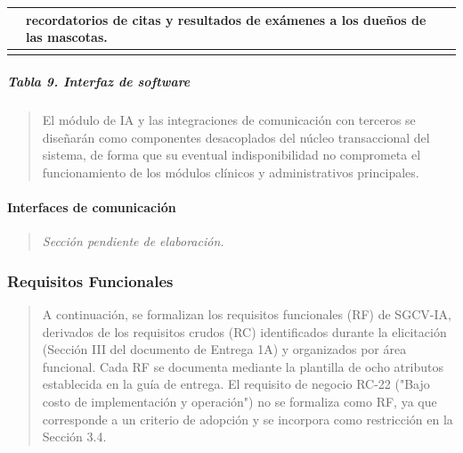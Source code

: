 {\def\LTcaptype{none} %
\begin{longtable}[]{@{}
  >{\raggedright\arraybackslash}p{}
  >{\raggedright\arraybackslash}p{}
  >{\raggedright\arraybackslash}p{}@{}}
\toprule\noalign{}
\begin{minipage}[b]{\linewidth}\raggedright
\end{minipage} & \begin{minipage}[b]{\linewidth}\raggedright
recordatorios de citas y resultados de exámenes a los dueños de las
mascotas.
\end{minipage} & \begin{minipage}[b]{\linewidth}\raggedright
\end{minipage} \\
\midrule\noalign{}
\endhead
\bottomrule\noalign{}
\endlastfoot
\end{longtable}
}

\subparagraph{Tabla 9. Interfaz de
software}\label{tabla-9.-interfaz-de-software}

\begin{quote}
El módulo de IA y las integraciones de comunicación con terceros se
diseñarán como componentes desacoplados del núcleo transaccional del
sistema, de forma que su eventual indisponibilidad no comprometa el
funcionamiento de los módulos clínicos y administrativos principales.
\end{quote}

\paragraph{Interfaces de
comunicación}\label{interfaces-de-comunicaciuxf3n}

\begin{quote}
\emph{Sección pendiente de elaboración.}
\end{quote}

\subsubsection{Requisitos Funcionales}\label{requisitos-funcionales}

\begin{quote}
A continuación, se formalizan los requisitos funcionales (RF) de
SGCV-IA, derivados de los requisitos crudos (RC) identificados durante
la elicitación (Sección III del documento de Entrega 1A) y organizados
por área funcional. Cada RF se documenta mediante la plantilla de ocho
atributos establecida en la guía de entrega. El requisito de negocio
RC-22 ("Bajo costo de implementación y operación") no se formaliza como
RF, ya que corresponde a un criterio de adopción y se incorpora como
restricción en la Sección 3.4.
\end{quote}

